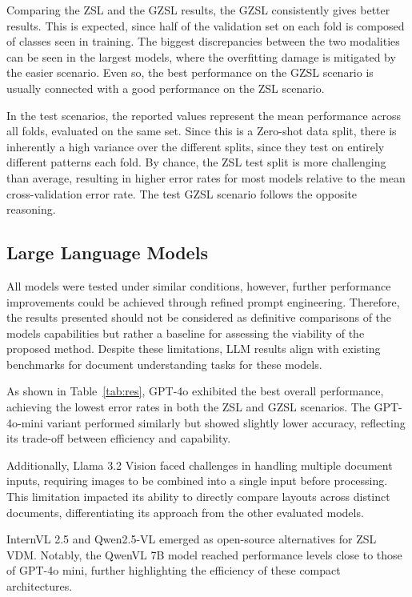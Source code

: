 Comparing the \gls{ZSL} and the \gls{GZSL} results, the \gls{GZSL} consistently gives better results. This is expected, since half of the validation set on each fold is composed of classes seen in training. The biggest discrepancies between the two modalities can be seen in the largest models, where the overfitting damage is mitigated by the easier scenario. Even so, the best performance on the \gls{GZSL} scenario is usually connected with a good performance on the \gls{ZSL} scenario.

In the test scenarios, the reported values represent the mean performance across all folds, evaluated on the same set. Since this is a Zero-shot data split, there is inherently a high variance over the different splits, since they test on entirely different patterns each fold. By chance, the \gls{ZSL} test split is more challenging than average, resulting in higher error rates for most models relative to the mean cross-validation error rate. The test \gls{GZSL} scenario follows the opposite reasoning.

\subsection{Large Language Models}
\label{sec:llm_result}

All models were tested under similar conditions, however, further performance improvements could be achieved through refined prompt engineering. Therefore, the results presented should not be considered as definitive comparisons of the models capabilities but rather a baseline for assessing the viability of the proposed method. Despite these limitations, \gls{LLM} results align with existing benchmarks for document understanding tasks for these models. 

As shown in Table~\ref{tab:res}, GPT-4o exhibited the best overall performance, achieving the lowest error rates in both the \gls{ZSL} and \gls{GZSL} scenarios. The GPT-4o-mini variant performed similarly but showed slightly lower accuracy, reflecting its trade-off between efficiency and capability.

Additionally, Llama 3.2 Vision faced challenges in handling multiple document inputs, requiring images to be combined into a single input before processing. This limitation impacted its ability to directly compare layouts across distinct documents, differentiating its approach from the other evaluated models.

InternVL 2.5 and Qwen2.5-VL emerged as open-source alternatives for  \gls{ZSL} \gls{VDM}. Notably, the QwenVL 7B model reached performance levels close to those of GPT-4o mini, further highlighting the efficiency of these compact architectures.

